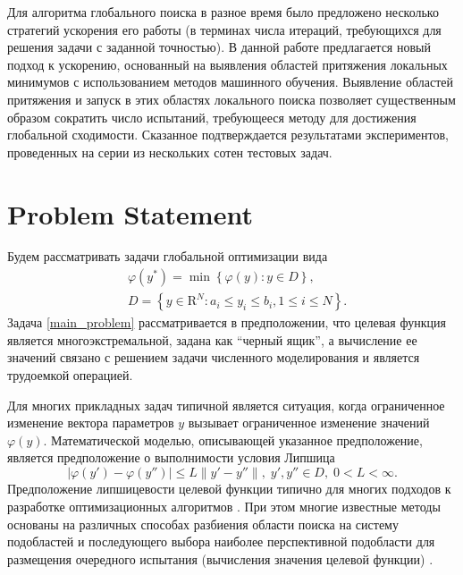 \documentclass[entropy,article,submit,moreauthors,pdftex]{Definitions/mdpi}
\begin{document}
Для алгоритма глобального поиска в разное время было предложено несколько стратегий ускорения его работы (в терминах числа итераций, требующихся для решения задачи с заданной точностью). В данной работе предлагается новый подход к ускорению, основанный на выявления областей притяжения локальных минимумов с использованием методов машинного обучения. Выявление областей притяжения и запуск в этих областях локального поиска позволяет существенным образом сократить число испытаний, требующееся методу для достижения глобальной сходимости. Сказанное подтверждается результатами экспериментов, проведенных на серии из нескольких сотен тестовых задач. 



\section{Problem Statement}

Будем рассматривать задачи глобальной оптимизации вида
\begin{eqnarray}\label{main_problem}
& \varphi(y^\ast)=\min{\left\{\varphi(y):y\in D\right\}},\\
& D=\left\{y\in \text{R}^N: a_i\leq y_i \leq b_i, 1\leq i \leq N\right\}. \nonumber
\end{eqnarray}
Задача \ref{main_problem} рассматривается в предположении, что целевая функция является многоэкстремальной, задана как ``черный ящик'', а вычисление ее значений связано с решением задачи численного моделирования и является трудоемкой операцией.

Для многих прикладных задач типичной является ситуация, когда ограниченное изменение вектора параметров $y$ вызывает ограниченное изменение значений $\varphi(y)$. Математической моделью, описывающей указанное предположение, является предположение о выполнимости условия Липшица
\[
\left|\varphi(y')-\varphi(y'')\right|\leq L\left\|y'-y''\right\|,\; y',y'' \in D,\; 0<L<\infty.
\]
Предположение липшицевости целевой функции типично для многих подходов к разработке оптимизационных алгоритмов \cite{Jones1993,Pinter1996,Zilinskas2008,Evtushenko2009}.
При этом многие известные методы основаны на различных способах разбиения области поиска на систему подобластей и последующего выбора наиболее перспективной подобласти для размещения очередного испытания (вычисления значения целевой функции) \cite{Jones2009,Zilinskas2010,Evtushenko2013,Kvasov2013,Paulavicius2016}. 
\end{document}
